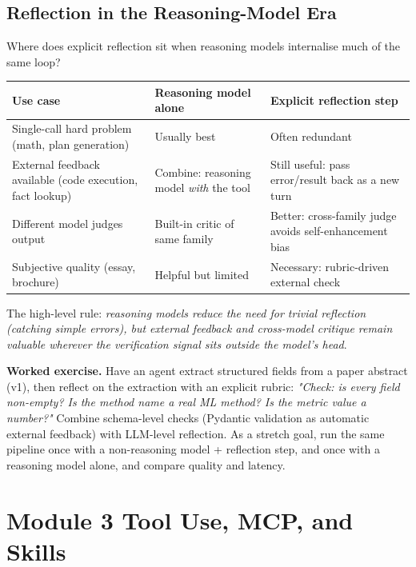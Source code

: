 \documentclass[a4paper,11pt]{article}
\begin{document}
\subsection{Reflection in the Reasoning-Model Era}

Where does explicit reflection sit when reasoning models internalise
much of the same loop?

\begin{center}\small
\begin{tabular}{p{4cm} p{4.5cm} p{4.5cm}}
  \toprule
  \textbf{Use case} & \textbf{Reasoning model alone} & \textbf{Explicit reflection step} \\
  \midrule
  Single-call hard problem (math, plan generation) & Usually best & Often redundant \\
  External feedback available (code execution, fact lookup) & Combine: reasoning model \emph{with} the tool & Still useful: pass error/result back as a new turn \\
  Different model judges output & Built-in critic of same family & Better: cross-family judge avoids self-enhancement bias \\
  Subjective quality (essay, brochure) & Helpful but limited &  Necessary: rubric-driven external check \\
  \bottomrule
\end{tabular}
\end{center}

The high-level rule: \textit{reasoning models reduce the need for
trivial reflection (catching simple errors), but external feedback
and cross-model critique remain valuable wherever the verification
signal sits outside the model's head}.

\begin{callout}
\textbf{Worked exercise.}
Have an agent extract structured fields from a paper abstract (v1),
then reflect on the extraction with an explicit rubric:
\textit{"Check: is every field non-empty? Is the method name a real
ML method? Is the metric value a number?"} Combine schema-level
checks (Pydantic validation as automatic external feedback) with
LLM-level reflection. As a stretch goal, run the same pipeline once
with a non-reasoning model + reflection step, and once with a
reasoning model alone, and compare quality and latency.
\end{callout}

\section{Module 3 \textemdash{} Tool Use, MCP, and Skills}
\end{document}
